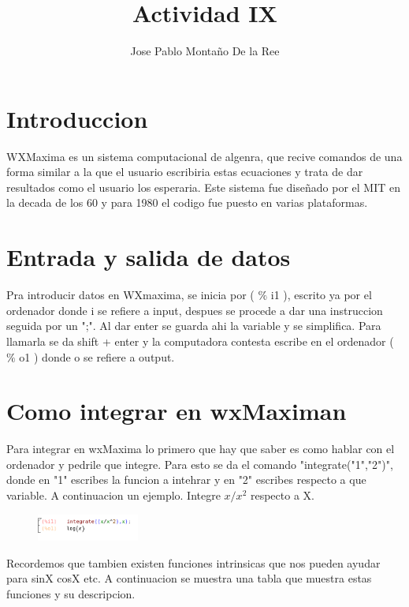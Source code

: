 \documentclass[a4paper]{article}
\title{Actividad IX}
\author{Jose Pablo Montaño De la Ree}
\begin{document}
\maketitle



\section{Introduccion}

WXMaxima es un sistema computacional de algenra, que recive comandos de una forma similar a la que el usuario escribiria estas ecuaciones y trata de dar resultados como el usuario los esperaria. Este sistema fue diseñado por el MIT en la decada de los 60 y para 1980 el codigo fue puesto en varias plataformas. 

\section{Entrada y salida de datos}

Pra introducir datos en WXmaxima, se inicia por ( $\%$ i1 ), escrito ya por el ordenador donde i se refiere a input, despues se procede a dar una instruccion seguida por un ";". Al dar enter se guarda ahi la variable y se simplifica. Para llamarla se da shift + enter y la computadora contesta  escribe en el ordenador  ( $\%$ o1 ) donde o se refiere a output.





\section{Como integrar en wxMaximan}

Para integrar en wxMaxima lo primero que hay que saber es como hablar con el ordenador y pedrile que integre. Para esto se da el comando "integrate("1","2")", donde en "1" escribes la funcion a intehrar y en "2" escribes respecto a que variable. A continuacion un ejemplo. 
\linebreak
Integre $x/x^2$ respecto a X.


\begin{figure}[ht!]
\centering
\includegraphics[width=0.3\textwidth]{1.png}
\caption{\label{fig:}}
\end{figure}


Recordemos que tambien existen funciones intrinsicas que nos pueden ayudar para sinX cosX etc. A continuacion se muestra una tabla que muestra estas funciones y su descripcion.
\newpage
\end{document}
